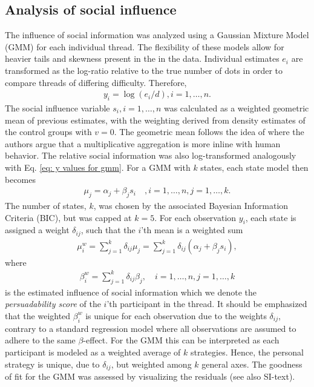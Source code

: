\documentclass[9pt,twocolumn,twoside,lineno]{article}
\begin{document}
{\subsection*{Analysis of social influence}
The influence of social information was analyzed using a Gaussian Mixture Model (GMM) for each individual thread. The flexibility of these models allow for heavier tails and skewness present in the in the data. Individual estimates $e_i$ are transformed as the log-ratio relative to the true number of dots in order to compare threads of differing difficulty. Therefore, 
\begin{align}
	y_i = \log(e_i/d), i=1,\dots,n. \label{eq: y values for gmm}
\end{align}
The social influence variable $s_i, i=1,\dots, n$ was calculated as a weighted geometric mean of previous estimates, with the weighting derived from density estimates of the control groups with $v=0$. The geometric mean follows the idea of \citep{jayles2017social} where the authors argue that a multiplicative aggregation is more inline with human behavior. The relative social information was also log-transformed analogously with Eq. \ref{eq: y values for gmm}.  For a GMM with $k$ states, each state model then becomes
\begin{align}
	\mu_j = \alpha_j+\beta_j s_i \quad, i=1,\dots,n, j=1, \dots,k. \label{eq: mean models}
\end{align}
The number of states, $k$, was chosen by the associated Bayesian Information Criteria (BIC), but was capped at $k=5$. For each observation $y_i$, each state is assigned a weight $\delta_{ij}$, such that the $i$'th mean is a weighted sum
\begin{align}
	\mu^w_i = \sum_{j=1}^k\delta_{ij}\mu_j = \sum_{j=1}^k\delta_{ij}(\alpha_j +\beta_j s_i),
\end{align}
where 
\begin{align}
	\beta^w_i = \sum_{j=1}^k \delta_{ij}\beta_j, \quad i=1,\dots, n, j=1,\dots,k \label{eq: weighted beta}
\end{align}
is the estimated influence of social information which we denote the \emph{persuadability score} of the $i$'th participant in the thread. It should be emphasized that the weighted $\beta^w_i$ is unique for each observation due to the weights $\delta_{ij}$, contrary to a standard regression model where all observations are assumed to adhere to the same $\beta$-effect. For the GMM this can be interpreted as each participant is modeled as a weighted average of $k$ strategies. Hence, the personal strategy is unique, due to $\delta_{ij}$, but weighted among $k$ general axes. The goodness of fit for the GMM was assessed by visualizing the residuals (see also SI-text). 
}
\showmatmethods{} %
\end{document}
